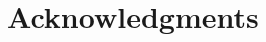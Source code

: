 \documentclass{article}
\begin{document}

\hypertarget{credits}{%
\section*{Acknowledgments}\label{credits}}
\end{document}
